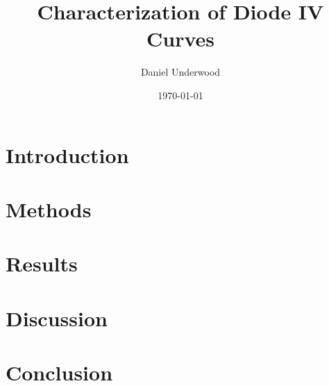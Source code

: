 \documentclass[reprint]{revtex4-1}
\begin{document}
\title{Characterization of Diode IV Curves}
\author{Daniel Underwood}
\date{\today}

\begin{abstract}

\end{abstract}
\maketitle

\section{Introduction}

\section{Methods}

\section{Results}

\section{Discussion}

\section{Conclusion}



\end{document}
